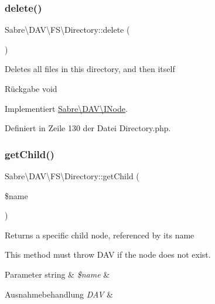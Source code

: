 \subsubsection{\texorpdfstring{delete()}{delete()}}
{\footnotesize\ttfamily Sabre\textbackslash{}\+D\+A\+V\textbackslash{}\+F\+S\textbackslash{}\+Directory\+::delete (\begin{DoxyParamCaption}{ }\end{DoxyParamCaption})}

Deletes all files in this directory, and then itself

\begin{DoxyReturn}{Rückgabe}
void 
\end{DoxyReturn}


Implementiert \mbox{\hyperlink{interface_sabre_1_1_d_a_v_1_1_i_node_a72cd0ee4e36dfced2b0412d14dbd73e6}{Sabre\textbackslash{}\+D\+A\+V\textbackslash{}\+I\+Node}}.



Definiert in Zeile 130 der Datei Directory.\+php.

\mbox{\label{class_sabre_1_1_d_a_v_1_1_f_s_1_1_directory_afb99c60f4a32c08a46d6bf3aa77e1089}} 
\subsubsection{\texorpdfstring{get\+Child()}{getChild()}}
{\footnotesize\ttfamily Sabre\textbackslash{}\+D\+A\+V\textbackslash{}\+F\+S\textbackslash{}\+Directory\+::get\+Child (\begin{DoxyParamCaption}\item[{}]{\$name }\end{DoxyParamCaption})}

Returns a specific child node, referenced by its name

This method must throw D\+AV if the node does not exist.


\begin{DoxyParams}[1]{Parameter}
string & {\em \$name} & \\
\hline
\end{DoxyParams}

\begin{DoxyExceptions}{Ausnahmebehandlung}
{\em D\+AV} & \\
\hline
\end{DoxyExceptions}


